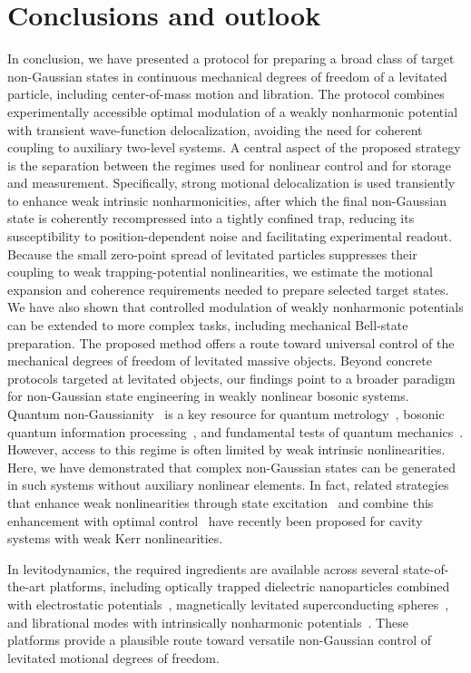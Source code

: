 \documentclass[reprint,prx,footinbib,floatfix,twocolumn,longbibliography,superscriptaddress]{revtex4-2}
\begin{document}
\section{Conclusions and outlook}
\label{sec_conc}
In conclusion, we have presented a protocol for preparing a broad class of target non-Gaussian states in continuous mechanical degrees of freedom of a levitated particle, including center-of-mass motion and libration.
The protocol combines experimentally accessible optimal modulation of a weakly nonharmonic potential with transient wave-function delocalization, avoiding the need for coherent coupling to auxiliary two-level systems.
A central aspect of the proposed strategy is the separation between the regimes used for nonlinear control and for storage and measurement.
Specifically, strong motional delocalization is used transiently to enhance weak intrinsic nonharmonicities, after which the final non-Gaussian state is coherently recompressed into a tightly confined trap, reducing its susceptibility to position-dependent noise and facilitating experimental readout.
Because the small zero-point spread of levitated particles suppresses their coupling to weak trapping-potential nonlinearities, we estimate the motional expansion and coherence requirements needed to prepare selected target states.
We have also shown that controlled modulation of weakly nonharmonic potentials can be extended to more complex tasks, including mechanical Bell-state preparation.
The proposed method offers a route toward universal control of the mechanical degrees of freedom of levitated massive objects.
Beyond concrete protocols targeted at levitated objects, our findings point to a broader paradigm for non-Gaussian state engineering in weakly nonlinear bosonic systems.
Quantum non-Gaussianity~\cite{Walschaers2021,Rakhubovsky2024} is a key resource for quantum metrology~\cite{Grochowski2025}, bosonic quantum information processing~\cite{Genoni2010}, and fundamental tests of quantum mechanics~\cite{Howl2021}.
However, access to this regime is often limited by weak intrinsic nonlinearities.
Here, we have demonstrated that complex non-Gaussian states can be generated in such systems without auxiliary nonlinear elements.
In fact, related strategies that enhance weak nonlinearities through state excitation~\cite{Lingenfelter2021} and combine this enhancement with optimal control~\cite{Yuan2025} have recently been proposed for cavity systems with weak Kerr nonlinearities.

In levitodynamics, the required ingredients are available across several state-of-the-art platforms, including optically trapped dielectric nanoparticles combined with electrostatic potentials~\cite{Millen2015,Conangla2020,Dania2021,Melo2024,Bonvin2024a}, magnetically levitated superconducting spheres~\cite{Hofer2023,GutierrezLatorre2023}, and librational modes with intrinsically nonharmonic potentials~\cite{Zielinska2023,Dania2025,Troyer2026}.
These platforms provide a plausible route toward versatile non-Gaussian control of levitated motional degrees of freedom.
\end{document}
